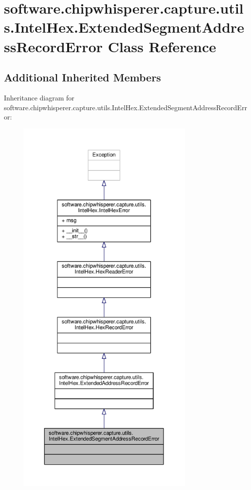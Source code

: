 \hypertarget{classsoftware_1_1chipwhisperer_1_1capture_1_1utils_1_1IntelHex_1_1ExtendedSegmentAddressRecordError}{}\section{software.\+chipwhisperer.\+capture.\+utils.\+Intel\+Hex.\+Extended\+Segment\+Address\+Record\+Error Class Reference}
\label{classsoftware_1_1chipwhisperer_1_1capture_1_1utils_1_1IntelHex_1_1ExtendedSegmentAddressRecordError}
\subsection*{Additional Inherited Members}


Inheritance diagram for software.\+chipwhisperer.\+capture.\+utils.\+Intel\+Hex.\+Extended\+Segment\+Address\+Record\+Error\+:\nopagebreak
\begin{figure}[H]
\begin{center}
\leavevmode
\includegraphics[height=550pt]{df/df7/classsoftware_1_1chipwhisperer_1_1capture_1_1utils_1_1IntelHex_1_1ExtendedSegmentAddressRecordError__inherit__graph}
\end{center}
\end{figure}


